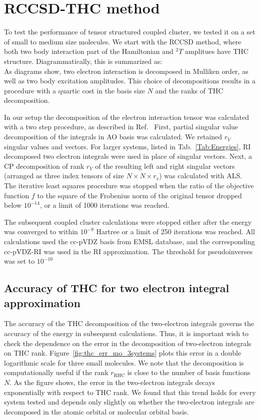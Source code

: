 \section{RCCSD-THC method}
To test the performance of tensor structured coupled cluster, we 
tested it on a set of small to medium size molecules. We 
start with the RCCSD method, where both two body interaction part of the 
Hamiltonian and ${}^2T$ amplitues have THC structure. Diagrammatically, this is 
summarized as:
%
\begin{equation}
\label{fig:rccsd_thc_def}
\end{equation}
%
As diagrams show, two electron interaction is decomposed in Mulliken order, as 
well as two body excitation amplitudes. This choice of decompositions results 
in a procedure with a quartic cost in the basis size $N$ and the ranks of THC 
decomposition.

In our setup the decomposition of the electron interaction tensor was 
calculated with a two step procedure, as described in 
Ref.~\cite{schutski2017tensor} First, partial singular value decomposition of 
the integrals in AO basis was calculated. We retained $r_{V}$ singular values 
and vectors. For larger systems, listed in Tab.~\ref{Tab:Energies}, RI 
decomposed two electron integrals were used in place of singular 
vectors. Next, a CP decomposition of rank $r_{V}$ of the resulting 
left and right singular vectors (arranged as three index tensors of size $N 
\times N \times r_{v}$) was calculated with ALS. The iterative least squares 
procedure was stopped when the ratio of the objective function $f$ to the square 
of the Frobenius norm of the original tensor dropped below $10^{-14}$, or a 
limit of 1000 iterations was reached.

The subsequent coupled cluster calculations were stopped either after the 
energy was converged to within $10^{-9}$ Hartree or a limit of 250 iterations 
was reached. All calculations used the cc-pVDZ basis from EMSL
database,\cite{schuchardt2007basis} and the corresponding cc-pVDZ-RI
was used in the RI approximation. The threshold for pseudoinverses was set to 
$10^{-10}$

\subsection{Accuracy of THC for two electron integral approximation}
The accuracy of the THC decomposition of the two-electron integrals governs the
accuracy of the energy in subsequent calculations. Thus, it is important 
wish to check the dependence on the error in the decomposition of
two-electron integrals on THC rank.
Figure~\ref{fig:thc_err_mo_3systems} plots this error in a double
logarithmic scale for three small molecules.  We note that the
decomposition is computationally useful if the rank $r_\mathrm{RHC}$
is close to the number of basis functions $N$.  As the figure shows,
the error in the two-electron integrals decays exponentially with
respect to THC rank.  We found that this trend holds for every system
tested and depends only slightly on whether the two-electron integrals
are decomposed in the atomic orbital or molecular orbital basis.

